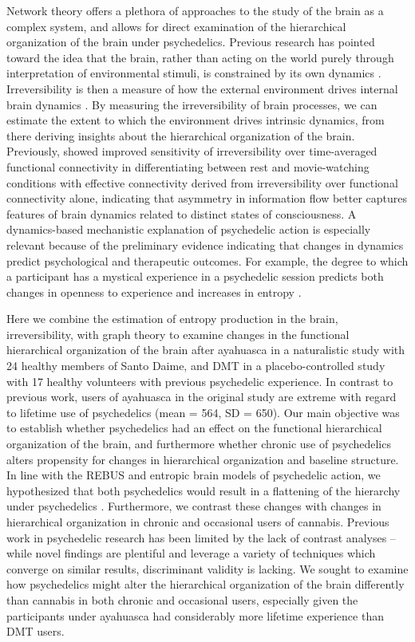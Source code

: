 Network theory offers a plethora of approaches to the study of the brain
as a complex system, and allows for direct examination of the
hierarchical organization of the brain under psychedelics. Previous
research has pointed toward the idea that the brain, rather than acting
on the world purely through interpretation of environmental stimuli, is
constrained by its own dynamics \parencite{Buzsaki2019}. Irreversibility is then
a measure of how the external environment drives internal brain dynamics \parencite{Buzsaki2019, Deco2022, Kringelbach2023}. By
measuring the irreversibility of brain processes, we can estimate the
extent to which the environment drives intrinsic dynamics, from there
deriving insights about the hierarchical organization of the brain.
Previously, \textcite{Kringelbach2023} showed improved sensitivity of
irreversibility over time-averaged functional connectivity in
differentiating between rest and movie-watching conditions with
effective connectivity derived from irreversibility over functional
connectivity alone, indicating that asymmetry in information flow better
captures features of brain dynamics related to distinct states of
consciousness. A dynamics-based mechanistic
explanation of psychedelic action is especially relevant because of the
preliminary evidence indicating that changes in dynamics predict
psychological and therapeutic outcomes. For example, the degree to which
a participant has a mystical experience in a psychedelic session
predicts both changes in openness to experience 
and increases in entropy \parencite{MacLean2011, Lebedev2016}.

Here we combine the estimation of entropy production in the brain,
irreversibility, with graph theory to examine changes in the functional
hierarchical organization of the brain after ayahuasca in a naturalistic
study with 24 healthy members of Santo Daime, and DMT in a
placebo-controlled study with 17 healthy volunteers with previous
psychedelic experience. In contrast to previous work, users of ayahuasca
in the original study are extreme with regard to lifetime use of
psychedelics (mean = 564, SD = 650). Our main objective was to establish
whether psychedelics had an effect on the functional hierarchical
organization of the brain, and furthermore whether chronic use of
psychedelics alters propensity for changes in hierarchical organization
and baseline structure. In line with the REBUS and entropic brain models
of psychedelic action, we hypothesized that both psychedelics would
result in a flattening of the hierarchy under psychedelics \parencite{Carhart-Harris2014,Carhart-Harris2019}.
Furthermore, we contrast these changes with changes in hierarchical
organization in chronic and occasional users of cannabis. Previous work
in psychedelic research has been limited by the lack of contrast
analyses -- while novel findings are plentiful and leverage a variety of
techniques which converge on similar results, discriminant validity is
lacking. We sought to examine how psychedelics might alter the
hierarchical organization of the brain differently than cannabis in both
chronic and occasional users, especially given the participants under
ayahuasca had considerably more lifetime experience than DMT users.